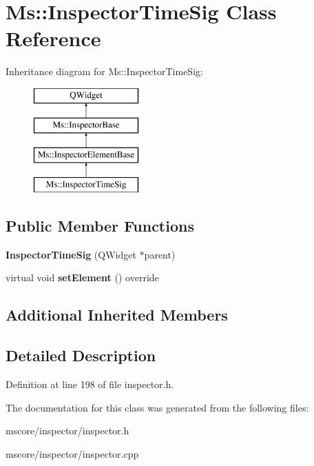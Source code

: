 \hypertarget{class_ms_1_1_inspector_time_sig}{}\section{Ms\+:\+:Inspector\+Time\+Sig Class Reference}
\label{class_ms_1_1_inspector_time_sig}
Inheritance diagram for Ms\+:\+:Inspector\+Time\+Sig\+:\begin{figure}[H]
\begin{center}
\leavevmode
\includegraphics[height=4.000000cm]{class_ms_1_1_inspector_time_sig}
\end{center}
\end{figure}
\subsection*{Public Member Functions}
\begin{DoxyCompactItemize}
\item 
\mbox{\label{class_ms_1_1_inspector_time_sig_aa4999e64a81ba6cfd7c9cb205820a9ec}} 
{\bfseries Inspector\+Time\+Sig} (Q\+Widget $\ast$parent)
\item 
\mbox{\label{class_ms_1_1_inspector_time_sig_a59598f99a178377e4f5d135671924319}} 
virtual void {\bfseries set\+Element} () override
\end{DoxyCompactItemize}
\subsection*{Additional Inherited Members}


\subsection{Detailed Description}


Definition at line 198 of file inspector.\+h.



The documentation for this class was generated from the following files\+:\begin{DoxyCompactItemize}
\item 
mscore/inspector/inspector.\+h\item 
mscore/inspector/inspector.\+cpp\end{DoxyCompactItemize}
